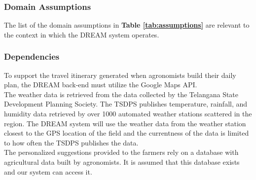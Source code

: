 \subsubsection{Domain Assumptions}

\begin{flushleft}
The list of the domain assumptions in \textbf{Table \ref{tab:assumptions}} are relevant to the context in which the DREAM system operates. 
\end{flushleft} 



\subsubsection{Dependencies}
\begin{flushleft}
To support the travel itinerary generated when agronomists build their daily plan, the DREAM back-end must utilize the Google Maps API. \\
\smallskip 
The weather data is retrieved from the data collected by the Telangana State Development Planning Society. The TSDPS publishes temperature, rainfall, and humidity data retrieved by over 1000 automated weather stations scattered in the region. The DREAM system will use the weather data from the weather station closest to the GPS location of the field and the currentness of the data is limited to how often the TSDPS publishes the data. \\
\smallskip
The personalized suggestions provided to the farmers rely on a database with agricultural data built by agronomists. It is assumed that this database exists and our system can access it. \\
\end{flushleft}


